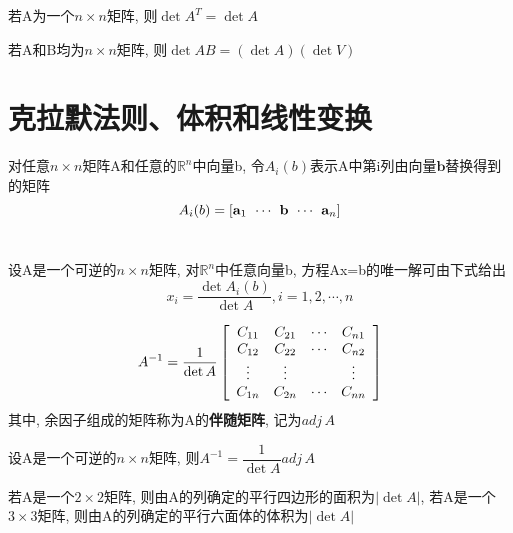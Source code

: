 \begin{TheoremOne}
若A为一个$n\times n$矩阵, 则$\det A^T=\det A$
\end{TheoremOne}\vspace{4ex}

\begin{TheoremTwo}[乘法的性质]
若A和B均为$n\times n$矩阵, 则$\det AB=(\det A)(\det V)$
\end{TheoremTwo}\vspace{8ex}

\section{克拉默法则、体积和线性变换}
对任意$n\times n$矩阵A和任意的$\mathbb{R}^n$中向量b, 令$A_i(b)$表示A中第i列由向量$\mathbf{b}$替换得到的矩阵
\[A_i(b)=[\mathbf{a}_1\hspace{1ex}\cdots\hspace{1ex}\mathbf{b}\hspace{1ex}\cdots\hspace{1ex}\mathbf{a}_n]\]\\[-1ex]

\begin{TheoremTwo}[克拉默法则]
设A是一个可逆的$n\times n$矩阵, 对$\mathbb{R}^n$中任意向量b, 方程Ax=b的唯一解可由下式给出
\[x_i=\frac{\det A_i(b)}{\det A},i=1,2,\cdots,n\]
\end{TheoremTwo}\vspace{4ex}

\[A^{-1}=\frac{1}{\det A}\left[\begin{array}{c c c c}
C_{11} & C_{21} & \cdots & C_{n1}\\
C_{12} & C_{22} & \cdots & C_{n2}\\
\vdots & \vdots & & \vdots\\
C_{1n} & C_{2n} & \cdots & C_{nn}
\end{array}\right]\]
其中, 余因子组成的矩阵称为A的\textbf{伴随矩阵}, 记为$adj\,A$\\[2ex]

\begin{TheoremTwo}[逆矩阵公式]
设A是一个可逆的$n\times n$矩阵, 则$A^{-1}=\dfrac{1}{\det A}adj\,A$
\end{TheoremTwo}\vspace{4ex}

\begin{TheoremOne}
若A是一个$2\times 2$矩阵, 则由A的列确定的平行四边形的面积为$|\det A|$, 若A是一个$3\times 3$矩阵, 则由A的列确定的平行六面体的体积为$|\det A|$
\end{TheoremOne}\vspace{4ex}

